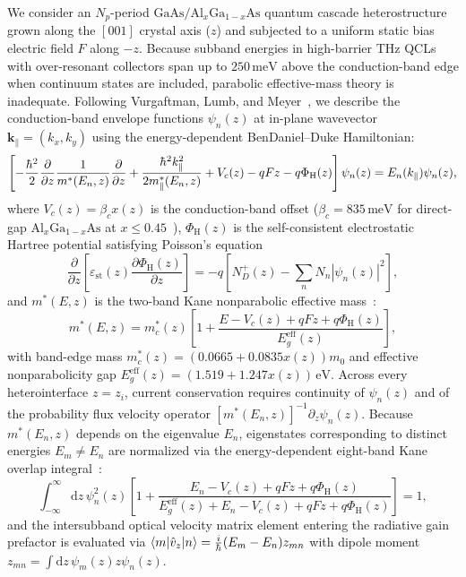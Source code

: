 \documentclass[11pt,letterpaper]{article}
\renewcommand{\hbar}{\mathchar'26\mkern-9mu h}
\begin{document}
We consider an $N_p$-period $\mathrm{GaAs}/\mathrm{Al}_x\mathrm{Ga}_{1-x}\mathrm{As}$ quantum cascade heterostructure grown along the $[001]$ crystal axis ($z$) and subjected to a uniform static bias electric field $F$ along $-z$. Because subband energies in high-barrier THz QCLs with over-resonant collectors span up to $250\,\mathrm{meV}$ above the conduction-band edge when continuum states are included, parabolic effective-mass theory is inadequate. Following Vurgaftman, Lumb, and Meyer~\cite{Vurgaftman2021}, we describe the conduction-band envelope functions $\psi_n(z)$ at in-plane wavevector $\bm{k}_\parallel = (k_x, k_y)$ using the energy-dependent BenDaniel--Duke Hamiltonian:
\begin{equation}
\left[ -\frac{\hbar^2}{2}\frac{\partial}{\partial z}\frac{1}{m^*(E_n, z)}\frac{\partial}{\partial z} + \frac{\hbar^2 k_\parallel^2}{2 m_\parallel^*(E_n, z)} + V_c(z) - q F z - q \Phi_{\mathrm{H}}(z) \right] \psi_n(z) = E_n(k_\parallel)\psi_n(z),
\label{eq:bendaniel_duke}
\end{equation}
where $V_c(z) = \beta_c x(z)$ is the conduction-band offset ($\beta_c = 835\,\mathrm{meV}$ for direct-gap $\mathrm{Al}_x\mathrm{Ga}_{1-x}\mathrm{As}$ at $x \le 0.45$~\cite{Vurgaftman2001}), $\Phi_{\mathrm{H}}(z)$ is the self-consistent electrostatic Hartree potential satisfying Poisson's equation
\begin{equation}
\frac{\partial}{\partial z}\left[\varepsilon_{\mathrm{st}}(z)\frac{\partial \Phi_{\mathrm{H}}(z)}{\partial z}\right] = -q \left[ N_D^+(z) - \sum_n N_n |\psi_n(z)|^2 \right],
\label{eq:poisson}
\end{equation}
and $m^*(E, z)$ is the two-band Kane nonparabolic effective mass~\cite{Kane1957,Vurgaftman2021}:
\begin{equation}
m^*(E, z) = m_c^*(z)\left[ 1 + \frac{E - V_c(z) + q F z + q\Phi_{\mathrm{H}}(z)}{E_g^{\mathrm{eff}}(z)} \right],
\label{eq:kane_mass}
\end{equation}
with band-edge mass $m_c^*(z) = (0.0665 + 0.0835 x(z))m_0$ and effective nonparabolicity gap $E_g^{\mathrm{eff}}(z) = (1.519 + 1.247 x(z))\,\mathrm{eV}$. Across every heterointerface $z = z_i$, current conservation requires continuity of $\psi_n(z)$ and of the probability flux velocity operator $[m^*(E_n, z)]^{-1}\partial_z \psi_n(z)$. Because $m^*(E_n, z)$ depends on the eigenvalue $E_n$, eigenstates corresponding to distinct energies $E_m \neq E_n$ are normalized via the energy-dependent eight-band Kane overlap integral~\cite{Vurgaftman2021}:
\begin{equation}
\int_{-\infty}^{\infty} \mathrm{d}z\,\psi_n^2(z)\left[ 1 + \frac{E_n - V_c(z) + q F z + q\Phi_{\mathrm{H}}(z)}{E_g^{\mathrm{eff}}(z) + E_n - V_c(z) + q F z + q\Phi_{\mathrm{H}}(z)} \right] = 1,
\label{eq:kane_norm}
\end{equation}
and the intersubband optical velocity matrix element entering the radiative gain prefactor is evaluated via $\langle m|\hat{v}_z|n\rangle = \frac{i}{\hbar}(E_m - E_n)z_{mn}$ with dipole moment $z_{mn} = \int \mathrm{d}z\,\psi_m(z) z \psi_n(z)$.
\end{document}
